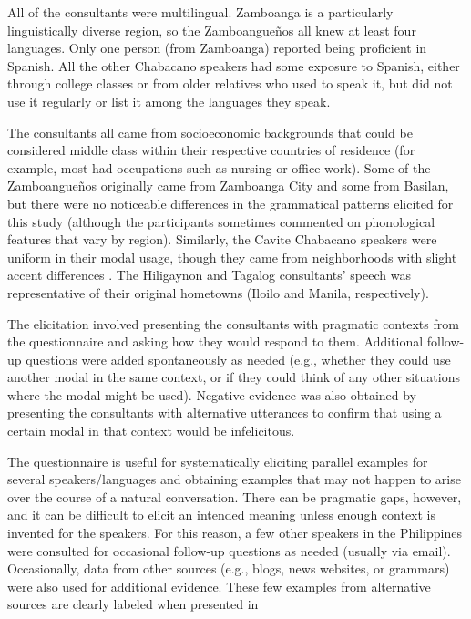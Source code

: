 All of the consultants were multilingual. Zamboanga is a particularly linguistically diverse region, so the Zamboangueños all knew at least four languages. Only one person (from Zamboanga) reported being proficient in Spanish. All the other Chabacano speakers had some exposure to Spanish, either through college classes or from older relatives who used to speak it, but did not use it regularly or list it among the languages they speak.

The consultants all came from socioeconomic backgrounds that could be considered middle class within their respective countries of residence (for example, most had occupations such as nursing or office work). Some of the Zamboangueños originally came from Zamboanga City and some from Basilan, but there were no noticeable differences in the grammatical patterns elicited for this study (although the participants sometimes commented on phonological features that vary by region). Similarly, the Cavite Chabacano speakers were uniform in their modal usage, though they came from neighborhoods with slight accent differences \citep{Lesho2018}. The Hiligaynon and Tagalog consultants’ speech was representative of their original hometowns (Iloilo and Manila, respectively).

The elicitation involved presenting the consultants with pragmatic contexts from the questionnaire and asking how they would respond to them. Additional follow-up questions were added spontaneously as needed (e.g., whether they could use another modal in the same context, or if they could think of any other situations where the modal might be used). Negative evidence was also obtained by presenting the consultants with alternative utterances to confirm that using a certain modal in that context would be infelicitous.  

The \citet{Dahl1985} questionnaire is useful for systematically eliciting parallel examples for several speakers/languages and obtaining examples that may not happen to arise over the course of a natural conversation. There can be pragmatic gaps, however, and it can be difficult to elicit an intended meaning unless enough context is invented for the speakers. For this reason, a few other speakers in the Philippines were consulted for occasional follow-up questions as needed (usually via email). Occasionally, data from other sources (e.g., blogs, news websites, or grammars) were also used for additional evidence. These few examples from alternative sources are clearly labeled when presented in 

